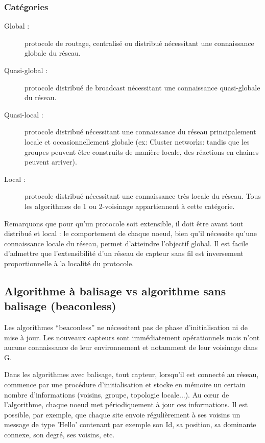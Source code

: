 \subsubsection{Catégories}
\begin{description}
 \item[Global :]protocole de routage, centralisé ou distribué nécessitant une connaissance globale du réseau.
 \item[Quasi-global :]protocole distribué de broadcast nécessitant une connaissance quasi-globale du réseau.
 \item[Quasi-local :]protocole distribué nécessitant une connaissance du réseau principalement locale et occasionnellement globale (ex: Cluster networks: tandis que les groupes peuvent être construits de manière locale, des réactions en chaines peuvent arriver).
 \item[Local :]protocole distribué nécessitant une connaissance très locale du réseau. Tous les algorithmes de 1 ou 2-voisinage appartiennent à cette catégorie.
\end{description}

Remarquons que pour qu'un protocole soit extensible, il doit être avant tout distribué et local :  le comportement de chaque noeud, bien qu'il nécessite qu'une connaissance locale du réseau, permet d'atteindre l'objectif global. Il est facile d'admettre que l'extensibilité d'un réseau de capteur sans fil est inversement proportionnelle à la localité du protocole.



\subsection{Algorithme à balisage vs algorithme sans balisage (beaconless)}
Les algorithmes ``beaconless'' ne nécessitent pas de phase d'initialisation ni de mise à jour. Les nouveaux capteurs sont immédiatement opérationnels mais n'ont aucune connaissance de leur environnement et notamment de leur voisinage dans G. 

Dans les algorithmes avec balisage, tout capteur, lorsqu'il est connecté au réseau, commence par une procédure d'initialisation et stocke en mémoire un certain nombre d'informations (voisins, groupe, topologie locale...). Au cœur de l'algorithme, chaque noeud met périodiquement à jour ces informations. Il est possible, par exemple, que chaque site envoie régulièrement à ses voisins un message de type
'Hello' contenant par exemple son Id, sa position, sa dominante connexe, son degré, ses voisins, etc.



